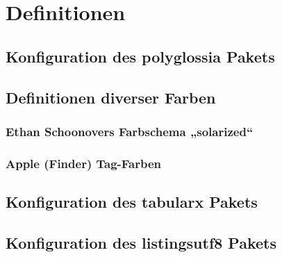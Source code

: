\documentclass[a4paper,12pt]{article}
\begin{document}
		\chapter{Definitionen}
			\section{Konfiguration des polyglossia Pakets}
				
			\section{Definitionen diverser Farben}
				\subsection{Ethan Schoonovers Farbschema „solarized“}
					
				\subsection{Apple (Finder) Tag-Farben}
					
			\section{Konfiguration des tabularx Pakets}
				
			\section{Konfiguration des listingsutf8 Pakets}
				

		
\end{document}
